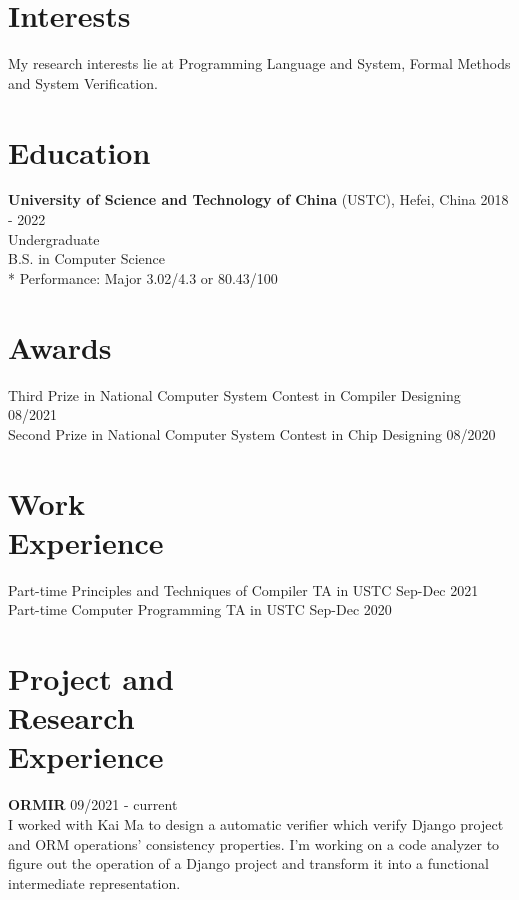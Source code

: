 \documentclass[margin, 10pt]{res}
\begin{document}
\address{{\bf Present Address} \\ Dept. of Computer Science\\ USTC\\
        230026 Hefei, P.R.China  }
\address{{\bf Contact Info} \\ (+86)18618154314 \\
         zhuez1819@mail.ustc.edu.cn }

\begin{resume}

\section{Interests}
My research interests lie at Programming Language and System, Formal Methods and System Verification. 
\section{Education}

{\bf University of Science and Technology of China} (USTC), Hefei, China \hfill 2018 - 2022 \\
Undergraduate \\
B.S. in Computer Science \\
* Performance: Major 3.02/4.3 or 80.43/100


\section{Awards}
Third Prize in National Computer System Contest in Compiler Designing \hfill 08/2021 \\
Second Prize in National Computer System Contest in Chip Designing \hfill 08/2020

\section{Work \\ Experience}
Part-time Principles and Techniques of Compiler TA in USTC \hfill Sep-Dec 2021 \\
Part-time Computer Programming TA in USTC \hfill Sep-Dec 2020

\section{Project and \\ Research \\ Experience}
{\bf ORMIR} 09/2021 - current \\
I worked with Kai Ma to design a automatic verifier which verify Django project and ORM operations' consistency properties. I'm working on a code analyzer to figure out the operation of a Django project and transform it into a functional intermediate representation.


\end{resume}
\end{document}
